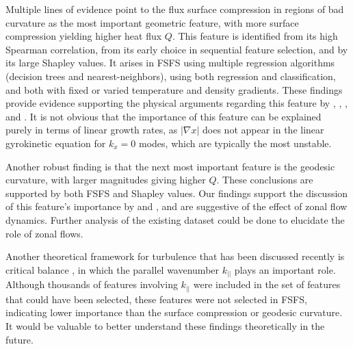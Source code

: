 \documentclass{jpp}
\newcommand{\changed}[1]{{#1}}
\begin{document}
Multiple lines of evidence point to the flux surface compression in regions of bad curvature as the most important geometric feature, with more surface compression yielding higher heat flux $Q$.
This feature is identified from its high Spearman correlation, from its early choice in sequential feature selection, and by its large Shapley values.
It arises in FSFS using multiple regression algorithms (decision trees and nearest-neighbors), using both regression and classification, and both with fixed or varied temperature and density gradients.
These findings provide evidence supporting the physical arguments regarding this feature by \cite{mynick2010optimizing}, \cite{xanthopoulos2014controlling}, \cite{stroteich2022seeking}, and \cite{goodman2024quasi}.
It is not obvious that the importance of this feature can be explained purely in terms of linear growth rates, as $|\nabla x|$ does not appear in the linear gyrokinetic equation for \changed{$k_x=0$} modes, which are typically the most unstable.

Another robust finding is that the next most important feature is the geodesic curvature, with larger magnitudes giving higher $Q$.
These conclusions are supported by both FSFS and Shapley values.
Our findings support the discussion of this feature's importance by \cite{xanthopoulos2011zonal} and \cite{NAKATA2022}, and are suggestive of the effect of zonal flow dynamics.
Further analysis of the existing dataset could be done to elucidate the role of zonal flows.

Another theoretical framework for turbulence that has been discussed recently is critical balance \citep{barnes2011critically}, in which the parallel wavenumber $k_{||}$ plays an important role.
Although thousands of features involving $k_{||}$ were included in the set of features that could have been selected, these features were not selected in FSFS, indicating lower importance than the surface compression or geodesic curvature.
It would be valuable to better understand these findings theoretically in the future.
\end{document}
